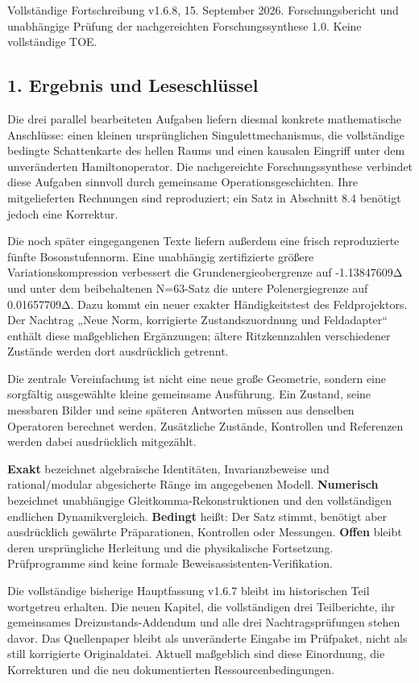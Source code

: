 Vollständige Fortschreibung v1.6.8, 15. September 2026.
Forschungsbericht und unabhängige Prüfung der nachgereichten
Forschungssynthese 1.0. Keine vollständige TOE.

\subsection{1. Ergebnis und
Leseschlüssel}\label{ergebnis-und-leseschluxfcssel}

Die drei parallel bearbeiteten Aufgaben liefern diesmal konkrete
mathematische Anschlüsse: einen kleinen ursprünglichen
Singulettmechanismus, die vollständige bedingte Schattenkarte des hellen
Raums und einen kausalen Eingriff unter dem unveränderten
Hamiltonoperator. Die nachgereichte Forschungssynthese verbindet diese
Aufgaben sinnvoll durch gemeinsame Operationsgeschichten. Ihre
mitgelieferten Rechnungen sind reproduziert; ein Satz in Abschnitt 8.4
benötigt jedoch eine Korrektur.

Die noch später eingegangenen Texte liefern außerdem eine frisch
reproduzierte fünfte Bosonstufennorm. Eine unabhängig zertifizierte
größere Variationskompression verbessert die Grundenergieobergrenze auf
-1.13847609Δ und unter dem beibehaltenen N=63-Satz die untere
Polenergiegrenze auf 0.01657709Δ. Dazu kommt ein neuer exakter
Händigkeitstest des Feldprojektors. Der Nachtrag „Neue Norm, korrigierte
Zustandszuordnung und Feldadapter`` enthält diese maßgeblichen
Ergänzungen; ältere Ritzkennzahlen verschiedener Zustände werden dort
ausdrücklich getrennt.

Die zentrale Vereinfachung ist nicht eine neue große Geometrie, sondern
eine sorgfältig ausgewählte kleine gemeinsame Ausführung. Ein Zustand,
seine messbaren Bilder und seine späteren Antworten müssen aus denselben
Operatoren berechnet werden. Zusätzliche Zustände, Kontrollen und
Referenzen werden dabei ausdrücklich mitgezählt.

\textbf{Exakt} bezeichnet algebraische Identitäten, Invarianzbeweise und
rational/modular abgesicherte Ränge im angegebenen Modell.
\textbf{Numerisch} bezeichnet unabhängige Gleitkomma-Rekonstruktionen
und den vollständigen endlichen Dynamikvergleich. \textbf{Bedingt}
heißt: Der Satz stimmt, benötigt aber ausdrücklich gewährte
Präparationen, Kontrollen oder Messungen. \textbf{Offen} bleibt deren
ursprüngliche Herleitung und die physikalische Fortsetzung.
Prüfprogramme sind keine formale Beweisassistenten-Verifikation.

Die vollständige bisherige Hauptfassung v1.6.7 bleibt im historischen
Teil wortgetreu erhalten. Die neuen Kapitel, die vollständigen drei
Teilberichte, ihr gemeinsames Dreizustands-Addendum und alle drei
Nachtragsprüfungen stehen davor. Das Quellenpaper bleibt als
unveränderte Eingabe im Prüfpaket, nicht als still korrigierte
Originaldatei. Aktuell maßgeblich sind diese Einordnung, die Korrekturen
und die neu dokumentierten Ressourcenbedingungen.

